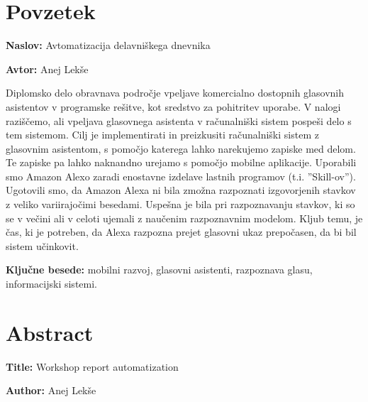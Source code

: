 \documentclass[a4paper, 12pt]{book}
\newcommand{\ttitle}{Avtomatizacija delavniškega dnevnika}
\newcommand{\ttitleEn}{Workshop report automatization}
\newcommand{\tauthor}{Anej Lekše}
\newcommand{\tkeywords}{mobilni razvoj, glasovni asistenti, razpoznava glasu, informacijski sistemi}
\newcommand{\clearemptydoublepage}{\newpage{\pagestyle{empty}\cleardoublepage}}
\begin{document}
\chapter*{Povzetek}

\noindent\textbf{Naslov:} \ttitle
\bigskip

\noindent\textbf{Avtor:} \tauthor
\bigskip


\noindent Diplomsko delo obravnava področje vpeljave komercialno dostopnih glasovnih asistentov v programske rešitve, kot sredstvo za pohitritev uporabe.
V nalogi raziščemo, ali vpeljava glasovnega asistenta v računalniški sistem pospeši delo s tem sistemom. 
Cilj je implementirati in preizkusiti računalniški sistem z glasovnim asistentom, s pomočjo katerega lahko narekujemo zapiske med delom. 
Te zapiske pa lahko naknandno urejamo s pomočjo mobilne aplikacije.
Uporabili smo Amazon Alexo zaradi enostavne izdelave lastnih programov (t.i. ''Skill-ov'').
Ugotovili smo, da Amazon Alexa ni bila zmožna razpoznati izgovorjenih stavkov z veliko variirajočimi besedami.
Uspešna je bila pri razpoznavanju stavkov, ki so se v večini ali v celoti ujemali z naučenim razpoznavnim modelom.
Kljub temu, je čas, ki je potreben, da Alexa razpozna prejet glasovni ukaz prepočasen, da bi bil sistem učinkovit.
\bigskip

\noindent\textbf{Ključne besede:} \tkeywords.
\clearemptydoublepage

\chapter*{Abstract}

\noindent\textbf{Title:} \ttitleEn
\bigskip

\noindent\textbf{Author:} \tauthor
\bigskip
\end{document}
